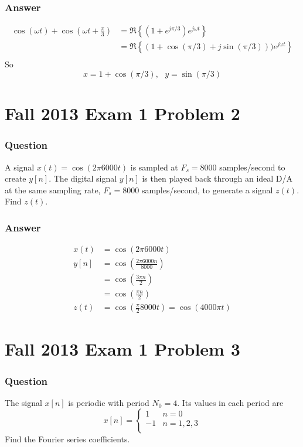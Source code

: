 \documentclass{beamer}
\begin{document}
\begin{frame}
  \frametitle{Answer}
  \begin{align*}
    \cos(\omega t)+\cos(\omega t+\frac{\pi}{3}) &= \Re\left\{(1+e^{j\pi/3})e^{j\omega t}\right\}\\
    &= \Re\left\{(1+\cos(\pi/3)+j\sin(\pi/3)))e^{j\omega t}\right\}\\
  \end{align*}
  So
  \[
  x=1+\cos(\pi/3),~~~y=\sin(\pi/3)
  \]
\end{frame}

\section[13x1p2]{Fall 2013 Exam 1 Problem 2}
\setcounter{subsection}{1}

\begin{frame}
  \frametitle{Question}
  A signal $x(t)=\cos(2\pi 6000t)$ is sampled at $F_s=8000$
  samples/second to create $y[n]$.  The digital signal $y[n]$ is then
  played back through an ideal D/A at the same sampling rate, $F_s=8000$
  samples/second, to generate a signal $z(t)$.  Find $z(t)$.
\end{frame}

\begin{frame}
  \frametitle{Answer}
  \begin{align*}
    x(t) &=\cos(2\pi 6000t)\\
    y[n] &=\cos\left(\frac{2\pi 6000n}{8000}\right)\\
    &=\cos\left(\frac{3\pi n}{2}\right)\\
    &=\cos\left(\frac{\pi n}{2}\right)\\
    z(t) &=\cos\left(\frac{\pi}{2}8000t\right)=\cos(4000\pi t)
  \end{align*}
\end{frame}

\section[13x1p3]{Fall 2013 Exam 1 Problem 3}
\setcounter{subsection}{1}

\begin{frame}
  \frametitle{Question}
  The signal $x[n]$ is periodic with period $N_0=4$.  Its values in each
  period are
  \[
  x[n]=\left\{\begin{array}{ll}
  1 & n=0\\
  -1 & n=1,2,3\\
  \end{array}\right.
  \]
  Find the Fourier series coefficients.
\end{frame}
\end{document}

